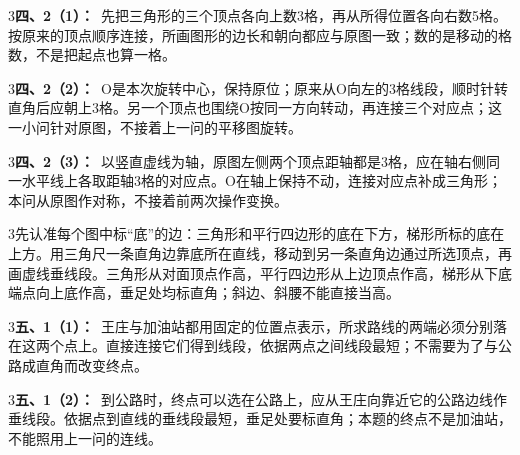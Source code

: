 \documentclass[multi=snippet,border={5bp 20bp 5bp 5bp}]{standalone}
\newenvironment{snippet}[3]{\begin{minipage}{#1bp}\color{answerred}\fontsize{#2}{#3}\selectfont\raggedright}{\end{minipage}}
\begin{document}
\begin{snippet}{505}{11.5}{14}\begin{multicols}{3}\raggedcolumns \textbf{四、2（1）：}\ 先把三角形的三个顶点各向上数3格，再从所得位置各向右数5格。按原来的顶点顺序连接，所画图形的边长和朝向都应与原图一致；数的是移动的格数，不是把起点也算一格。\end{multicols}\end{snippet}
\begin{snippet}{505}{11.5}{14}\begin{multicols}{3}\raggedcolumns \textbf{四、2（2）：}\ O是本次旋转中心，保持原位；原来从O向左的3格线段，顺时针转直角后应朝上3格。另一个顶点也围绕O按同一方向转动，再连接三个对应点；这一小问针对原图，不接着上一问的平移图旋转。\end{multicols}\end{snippet}
\begin{snippet}{505}{11.5}{14}\begin{multicols}{3}\raggedcolumns \textbf{四、2（3）：}\ 以竖直虚线为轴，原图左侧两个顶点距轴都是3格，应在轴右侧同一水平线上各取距轴3格的对应点。O在轴上保持不动，连接对应点补成三角形；本问从原图作对称，不接着前两次操作变换。\end{multicols}\end{snippet}
\begin{snippet}{505}{11.5}{14}\begin{multicols}{3}\raggedcolumns 先认准每个图中标“底”的边：三角形和平行四边形的底在下方，梯形所标的底在上方。用三角尺一条直角边靠底所在直线，移动到另一条直角边通过所选顶点，再画虚线垂线段。三角形从对面顶点作高，平行四边形从上边顶点作高，梯形从下底端点向上底作高，垂足处均标直角；斜边、斜腰不能直接当高。\end{multicols}\end{snippet}
\begin{snippet}{505}{11.5}{14}\begin{multicols}{3}\raggedcolumns \textbf{五、1（1）：}\ 王庄与加油站都用固定的位置点表示，所求路线的两端必须分别落在这两个点上。直接连接它们得到线段，依据两点之间线段最短；不需要为了与公路成直角而改变终点。\end{multicols}\end{snippet}
\begin{snippet}{505}{11.5}{14}\begin{multicols}{3}\raggedcolumns \textbf{五、1（2）：}\ 到公路时，终点可以选在公路上，应从王庄向靠近它的公路边线作垂线段。依据点到直线的垂线段最短，垂足处要标直角；本题的终点不是加油站，不能照用上一问的连线。\end{multicols}\end{snippet}
\end{document}
